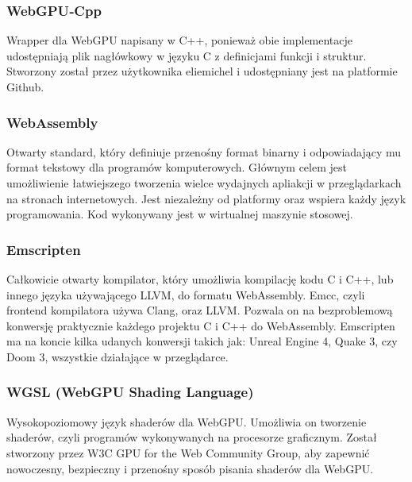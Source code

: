   \subsubsection{WebGPU‑Cpp} 
  Wrapper dla WebGPU napisany w C++, ponieważ obie implementacje udostępniają plik nagłówkowy w języku C z definicjami funkcji i struktur. Stworzony został przez użytkownika eliemichel i udostępniany jest na platformie Github.

  \subsubsection{WebAssembly}
  Otwarty standard, który definiuje przenośny format binarny i odpowiadający mu format tekstowy dla programów komputerowych. Głównym celem jest umożliwienie łatwiejszego tworzenia wielce wydajnych apliakcji w przeglądarkach na stronach internetowych. Jest niezależny od platformy oraz wspiera każdy język programowania. Kod wykonywany jest w wirtualnej maszynie stosowej.
  
  \subsubsection{Emscripten}
  Całkowicie otwarty kompilator, który umożliwia kompilację kodu C i C++, lub innego języka używającego LLVM, do formatu WebAssembly. Emcc, czyli frontend kompilatora używa Clang, oraz LLVM. Pozwala on na bezproblemową konwersję praktycznie każdego projektu C i C++ do WebAssembly. Emscripten ma na koncie kilka udanych konwersji takich jak: Unreal Engine 4, Quake 3, czy Doom 3, wszystkie działające w przeglądarce.

  \subsubsection{WGSL (WebGPU Shading Language)}
  \begin{komentarz}
  Wysokopoziomowy język shaderów dla WebGPU. Umożliwia on tworzenie shaderów, czyli programów wykonywanych na procesorze graficznym. Został stworzony przez W3C GPU for the Web Community Group, aby zapewnić nowoczesny, bezpieczny i przenośny sposób pisania shaderów dla WebGPU.
  \end{komentarz}

